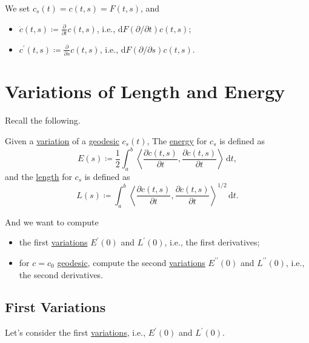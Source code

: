 \begin{notation}
	We set \(c_s(t) = c(t, s)=F(t, s)\), and
	\begin{itemize}
		\item \(\dot{c}(t, s) \coloneqq \frac{\partial }{\partial t} c(t, s) \), i.e., \(\mathrm{d} F(\partial / \partial t) c(t, s)\);
		\item \(c^\prime (t, s) \coloneqq \frac{\partial}{\partial s} c(t, s)\), i.e., \(\mathrm{d} F (\partial / \partial s)c(t, s)\).
	\end{itemize}
\end{notation}

\section{Variations of Length and Energy}
Recall the following.

\begin{prev}
	Given a \hyperref[prev:variation]{variation} of a \hyperref[def:geodesic]{geodesic} \(c_s(t)\), The \hyperref[def:energy]{energy} for \(c_s\) is defined as
	\[
		E(s) \coloneqq \frac{1}{2} \int_{a}^{b} \left\langle \frac{\partial c(t, s)}{\partial t} , \frac{\partial c(t, s)}{\partial t}  \right\rangle  \,\mathrm{d}t,
	\]
	and the \hyperref[def:length]{length} for \(c_s\) is defined as
	\[
		L(s) \coloneqq \int_{a}^{b} \left\langle \frac{\partial c(t, s)}{\partial t} , \frac{\partial c(t, s)}{\partial t}  \right\rangle ^{1 / 2} \,\mathrm{d}t.
	\]
\end{prev}

And we want to compute
\begin{itemize}
	\item the first \hyperref[prev:variation]{variations} \(E^\prime (0) \) and \(L^\prime (0)\), i.e., the first derivatives;
	\item for \(c = c_0\) \hyperref[def:geodesic]{geodesic}, compute the second \hyperref[prev:variation]{variations} \(E^{\prime\prime}(0) \) and \(L^{\prime\prime}(0)\), i.e., the second derivatives.
\end{itemize}
\subsection{First Variations}
Let's consider the first \hyperref[prev:variation]{variations}, i.e., \(E^{\prime} (0)\) and \(L^{\prime} (0)\).

